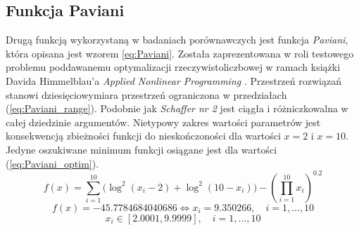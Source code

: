 \subsection{Funkcja Paviani}
\par
Drugą funkcją wykorzystaną w badaniach porównawczych jest funkcja \emph{Paviani}, która opisana jest wzorem \ref{eq:Paviani}. Została zaprezentowana w roli testowego problemu poddawanemu optymalizacji rzeczywistoliczbowej w ramach książki Davida Himmelblau'a \emph{Applied Nonlinear Programming} \cite{himmelblau1972applied}. Przestrzeń rozwiązań stanowi dziesięciowymiara przestrzeń ograniczona w przedziałach (\ref{eq:Paviani_range}). Podobnie jak \emph{Schaffer nr 2} jest ciągła i różniczkowalna w całej dziedzinie argumentów. Nietypowy zakres wartości parametrów jest konsekwencją zbieżności funkcji do nieskończoności dla wartości $x=2$ i $x=10$. Jedyne oszukiwane minimum funkcji osiągane jest dla wartości (\ref{eq:Paviani_optim}).
\begin{equation}\label{eq:Paviani}
f(x)=\sum_{i=1}^{10} \bigg(\log^2(x_i-2) + \log^2(10-x_i)\bigg) - \left(
\prod_{i=1}^{10} x_i\right)^{0.2}
\end{equation}
\begin{equation} \label{eq:Paviani_optim}
f(x)=-45.7784684040686 \Leftrightarrow x_i = 9.350266,\quad i = 1, ..., 10
\end{equation}
\begin{equation} \label{eq:Paviani_range}
x_i\in[2.0001,9.9999], \quad i=1,...,10
\end{equation}

